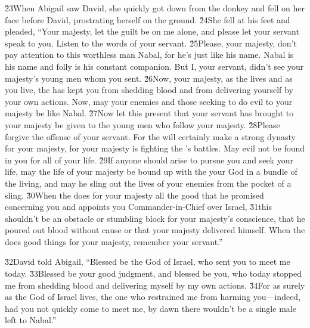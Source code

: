 \v{23}When Abigail saw David, she quickly got down from the donkey and fell on her face before David, prostrating herself on the ground. \v{24}She fell at his feet and pleaded, ``Your majesty, let the guilt be on me alone, and please let your servant speak to you. Listen to the words of your servant. \v{25}Please, your majesty, don't pay attention to this worthless man Nabal, for he's just like his name. Nabal is his name and folly is his constant companion. But I, your servant, didn't see your majesty's young men whom you sent. \v{26}Now, your majesty, as the  lives and as you live, the  has kept you from shedding blood and from delivering yourself by your own actions. Now, may your enemies and those seeking to do evil to your majesty be like Nabal. \v{27}Now let this present that your servant has brought to your majesty be given to the young men who follow your majesty. \v{28}Please forgive the offense of your servant. For the  will certainly make a strong dynasty for your majesty, for your majesty is fighting the 's battles. May evil not be found in you for all of your life. \v{29}If anyone should arise to pursue you and seek your life, may the life of your majesty be bound up with the  your God in a bundle of the living, and may he sling out the lives of your enemies from the pocket of a sling. \v{30}When the  does for your majesty all the good that he promised concerning you and appoints you Commander-in-Chief over Israel, \v{31}this shouldn't be an obstacle or stumbling block for your majesty's conscience, that he poured out blood without cause or that your majesty delivered himself. When the  does good things for your majesty, remember your servant.''

\v{32}David told Abigail, ``Blessed be the  God of Israel, who sent you to meet me today. \v{33}Blessed be your good judgment, and blessed be you, who today stopped me from shedding blood and delivering myself by my own actions. \v{34}For as surely as the  God of Israel lives, the one who restrained me from harming you---indeed, had you not quickly come to meet me, by dawn there wouldn't be a single male left to Nabal.''

